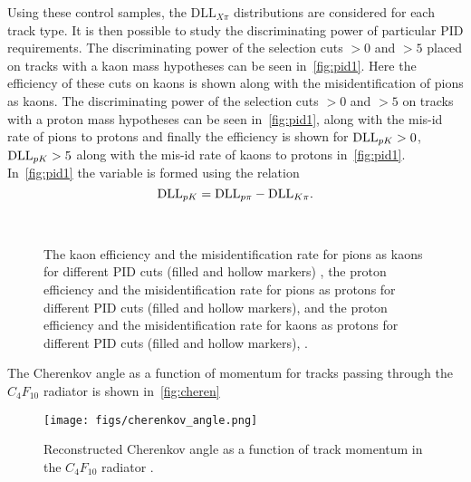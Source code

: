 Using these control samples, the $\text{DLL}_{X\pi}$ distributions are considered for each track type. It is then possible to study the discriminating power of particular PID requirements. The discriminating power of the selection cuts \dllkpi$>0$ and \dllkpi$>5$ placed on tracks with a kaon mass hypotheses can be seen in~\autoref{fig:pid1}\protect{}. Here the efficiency of these cuts on kaons is shown along with the misidentification of pions as kaons.
 The discriminating power of the selection cuts \dllppi$>0$ and \dllppi$>5$ on tracks with a proton mass hypotheses can be seen in~\autoref{fig:pid1}\protect{}, along with the mis-id rate of pions to protons and finally the efficiency is shown for $\mathrm{DLL}_{{p}{K}}>0$, $\mathrm{DLL}_{{p}{K}}>5$ along with the mis-id rate of kaons to protons in~\autoref{fig:pid1}\protect{}. In~\autoref{fig:pid1}\protect{} the variable \dllpk is formed using the relation
\begin{equation}
  \mathrm{DLL}_{{p}{K}} = \mathrm{DLL}_{{p}{\pi}} - \mathrm{DLL}_{{K}{\pi}}.
\end{equation}

\begin{figure}[h!]
  \centering
      \\
      \caption{The kaon efficiency and the misidentification rate for pions as kaons for different PID cuts (filled and hollow markers) \protect{}, the proton efficiency and the misidentification rate for pions as protons for different PID cuts (filled and hollow markers), \protect{} and the proton efficiency and the misidentification rate for kaons as protons for different PID cuts (filled and hollow markers), \protect{} \cite{LHCb-DP-2012-003}.}
  \label{fig:pid1}
\end{figure}

The Cherenkov angle as a function of momentum for tracks passing through the $C_{4}F_{10}$ radiator is shown in~\autoref{fig:cheren}
\begin{figure}[h!]
  \centering
  \texttt{[image: figs/cherenkov\_angle.png]} 
  \caption{Reconstructed Cherenkov angle as a function of track momentum in the $C_{4}F_{10}$ radiator \cite{LHCb-DP-2012-003}.
  }
  \label{fig:cheren}
\end{figure}





